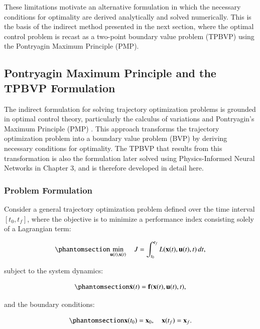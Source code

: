 \documentclass[
  number,
  preprint]{elsarticle}
\begin{document}
These limitations motivate an alternative formulation in which the
necessary conditions for optimality are derived analytically and solved
numerically. This is the basis of the indirect method presented in the
next section, where the optimal control problem is recast as a two-point
boundary value problem (TPBVP) using the Pontryagin Maximum Principle
(PMP).

\subsection{Pontryagin Maximum Principle and the TPBVP
Formulation}\label{pontryagin-maximum-principle-and-the-tpbvp-formulation}

The indirect formulation for solving trajectory optimization problems is
grounded in optimal control theory, particularly the calculus of
variations and Pontryagin's Maximum Principle (PMP)
\citep{sanchez2018real}. This approach transforms the trajectory
optimization problem into a boundary value problem (BVP) by deriving
necessary conditions for optimality. The TPBVP that results from this
transformation is also the formulation later solved using
Physics-Informed Neural Networks in Chapter 3, and is therefore
developed in detail here.

\subsubsection{Problem Formulation}\label{problem-formulation}

Consider a general trajectory optimization problem defined over the time
interval \([t_0, t_f]\), where the objective is to minimize a
performance index consisting solely of a Lagrangian term:

\begin{equation}\protect\phantomsection\label{eq-ch2-cost-function}{
\min_{\mathbf{u}(t), \mathbf{x}(t)} \quad J = \int_{t_0}^{t_f} L(\mathbf{x}(t), \mathbf{u}(t), t) \, dt,
}\end{equation}

subject to the system dynamics:

\begin{equation}\protect\phantomsection\label{eq-ch2-dynamics}{
\dot{\mathbf{x}}(t) = \mathbf{f}(\mathbf{x}(t), \mathbf{u}(t), t),
}\end{equation}

and the boundary conditions:

\begin{equation}\protect\phantomsection\label{eq-ch2-bc-indirect}{
\mathbf{x}(t_0) = \mathbf{x}_0, \quad \mathbf{x}(t_f) = \mathbf{x}_f.
}\end{equation}
\end{document}
